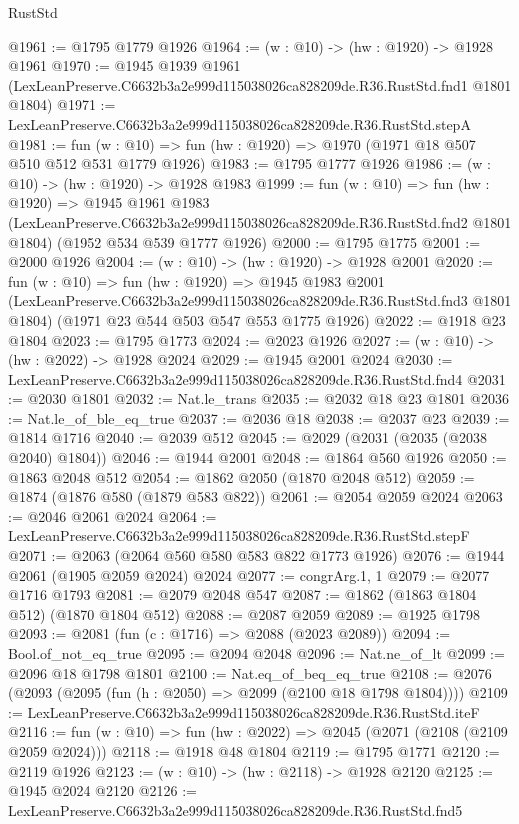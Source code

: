 \begin{lexlean}{RustStd}
\begin{coremodule}
@1961 := @1795 @1779 @1926
@1964 := (w : @10) -> (hw : @1920) -> @1928 @1961
@1970 := @1945
    @1939
    @1961
    (LexLeanPreserve.C6632b3a2e999d115038026ca828209de.R36.RustStd.fnd1 @1801 @1804)
@1971 := LexLeanPreserve.C6632b3a2e999d115038026ca828209de.R36.RustStd.stepA
@1981 := fun (w : @10) => fun (hw : @1920) => @1970 (@1971 @18 @507 @510 @512 @531 @1779 @1926)
@1983 := @1795 @1777 @1926
@1986 := (w : @10) -> (hw : @1920) -> @1928 @1983
@1999 := fun (w : @10) =>
  fun (hw : @1920) =>
  @1945
    @1961
    @1983
    (LexLeanPreserve.C6632b3a2e999d115038026ca828209de.R36.RustStd.fnd2 @1801 @1804)
    (@1952 @534 @539 @1777 @1926)
@2000 := @1795 @1775
@2001 := @2000 @1926
@2004 := (w : @10) -> (hw : @1920) -> @1928 @2001
@2020 := fun (w : @10) =>
  fun (hw : @1920) =>
  @1945
    @1983
    @2001
    (LexLeanPreserve.C6632b3a2e999d115038026ca828209de.R36.RustStd.fnd3 @1801 @1804)
    (@1971 @23 @544 @503 @547 @553 @1775 @1926)
@2022 := @1918 @23 @1804
@2023 := @1795 @1773
@2024 := @2023 @1926
@2027 := (w : @10) -> (hw : @2022) -> @1928 @2024
@2029 := @1945 @2001 @2024
@2030 := LexLeanPreserve.C6632b3a2e999d115038026ca828209de.R36.RustStd.fnd4
@2031 := @2030 @1801
@2032 := Nat.le_trans
@2035 := @2032 @18 @23 @1801
@2036 := Nat.le_of_ble_eq_true
@2037 := @2036 @18
@2038 := @2037 @23
@2039 := @1814 @1716
@2040 := @2039 @512
@2045 := @2029 (@2031 (@2035 (@2038 @2040) @1804))
@2046 := @1944 @2001
@2048 := @1864 @560 @1926
@2050 := @1863 @2048 @512
@2054 := @1862 @2050 (@1870 @2048 @512)
@2059 := @1874 (@1876 @580 (@1879 @583 @822))
@2061 := @2054 @2059 @2024
@2063 := @2046 @2061 @2024
@2064 := LexLeanPreserve.C6632b3a2e999d115038026ca828209de.R36.RustStd.stepF
@2071 := @2063 (@2064 @560 @580 @583 @822 @1773 @1926)
@2076 := @1944 @2061 (@1905 @2059 @2024) @2024
@2077 := congrArg.{1, 1}
@2079 := @2077 @1716 @1793
@2081 := @2079 @2048 @547
@2087 := @1862 (@1863 @1804 @512) (@1870 @1804 @512)
@2088 := @2087 @2059
@2089 := @1925 @1798
@2093 := @2081 (fun (c : @1716) => @2088 (@2023 @2089))
@2094 := Bool.of_not_eq_true
@2095 := @2094 @2048
@2096 := Nat.ne_of_lt
@2099 := @2096 @18 @1798 @1801
@2100 := Nat.eq_of_beq_eq_true
@2108 := @2076 (@2093 (@2095 (fun (h : @2050) => @2099 (@2100 @18 @1798 @1804))))
@2109 := LexLeanPreserve.C6632b3a2e999d115038026ca828209de.R36.RustStd.iteF
@2116 := fun (w : @10) => fun (hw : @2022) => @2045 (@2071 (@2108 (@2109 @2059 @2024)))
@2118 := @1918 @48 @1804
@2119 := @1795 @1771
@2120 := @2119 @1926
@2123 := (w : @10) -> (hw : @2118) -> @1928 @2120
@2125 := @1945 @2024 @2120
@2126 := LexLeanPreserve.C6632b3a2e999d115038026ca828209de.R36.RustStd.fnd5

\end{coremodule}
\end{lexlean}
